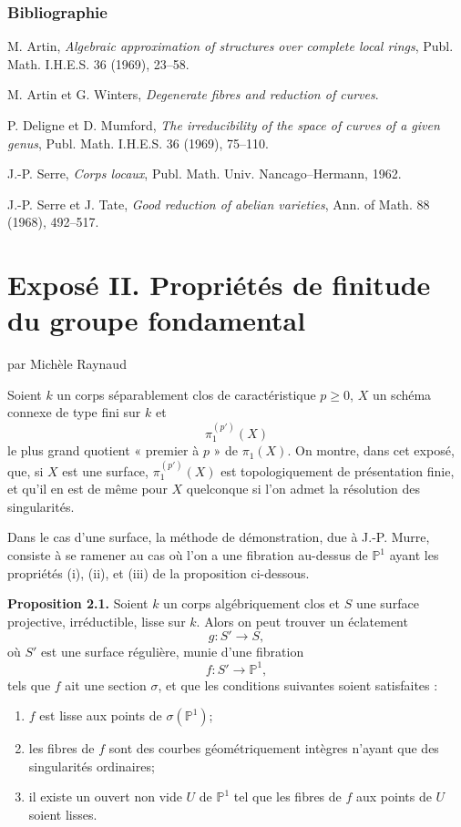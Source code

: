 \documentclass[11pt]{article}
\begin{document}
\subsubsection*{Bibliographie}
\begin{enumerate}[label={[\arabic*]}]
\item M. Artin, \emph{Algebraic approximation of structures over complete local rings}, Publ. Math. I.H.E.S. 36 (1969), 23--58.
\item M. Artin et G. Winters, \emph{Degenerate fibres and reduction of curves}.
\item P. Deligne et D. Mumford, \emph{The irreducibility of the space of curves of a given genus}, Publ. Math. I.H.E.S. 36 (1969), 75--110.
\item J.-P. Serre, \emph{Corps locaux}, Publ. Math. Univ. Nancago--Hermann, 1962.
\item J.-P. Serre et J. Tate, \emph{Good reduction of abelian varieties}, Ann. of Math. 88 (1968), 492--517.
\end{enumerate}

\section*{Exposé II. Propriétés de finitude du groupe fondamental}
\begin{center}
par Michèle Raynaud
\end{center}
Soient $k$ un corps séparablement clos de caractéristique $p\ge0$, $X$ un schéma connexe de type fini sur $k$ et
\[
 \pi_1^{(p')}(X)
\]
le plus grand quotient « premier à $p$ » de $\pi_1(X)$. On montre, dans cet exposé, que, si $X$ est une surface, $\pi_1^{(p')}(X)$ est topologiquement de présentation finie, et qu'il en est de même pour $X$ quelconque si l'on admet la résolution des singularités.

Dans le cas d'une surface, la méthode de démonstration, due à J.-P. Murre, consiste à se ramener au cas où l'on a une fibration au-dessus de $\mathbb P^1$ ayant les propriétés (i), (ii), et (iii) de la proposition ci-dessous.

\textbf{Proposition 2.1.} Soient $k$ un corps algébriquement clos et $S$ une surface projective, irréductible, lisse sur $k$. Alors on peut trouver un éclatement
\[
 g:S'\longrightarrow S,
\]
où $S'$ est une surface régulière, munie d'une fibration
\[
 f:S'\longrightarrow \mathbb P^1,
\]
tels que $f$ ait une section $\sigma$, et que les conditions suivantes soient satisfaites :
\begin{enumerate}[label=\textup{(\roman*)}]
\item $f$ est lisse aux points de $\sigma(\mathbb P^1)$;
\item les fibres de $f$ sont des courbes géométriquement intègres n'ayant que des singularités ordinaires;
\item il existe un ouvert non vide $U$ de $\mathbb P^1$ tel que les fibres de $f$ aux points de $U$ soient lisses.
\end{enumerate}
\end{document}

